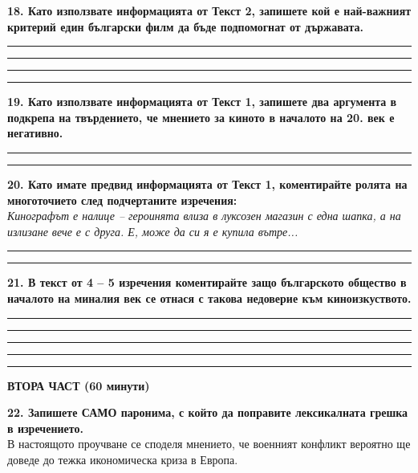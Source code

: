 \documentclass[12pt,a4paper]{article}
\begin{document}
\vspace{0.6cm}

\noindent
\textbf{18. Като използвате информацията от Текст 2, запишете кой е най-важният критерий един български филм да бъде подпомогнат от държавата.}

\vspace{0.2cm}
\noindent\rule{\linewidth}{0.4pt}
\noindent\rule{\linewidth}{0.4pt}
\noindent\rule{\linewidth}{0.4pt}
\noindent\rule{\linewidth}{0.4pt}

\vspace{0.6cm}

\noindent
\textbf{19. Като използвате информацията от Текст 1, запишете два аргумента в подкрепа на твърдението, че мнението за киното в началото на 20. век е негативно.}

\vspace{0.2cm}
\noindent\rule{\linewidth}{0.4pt}
\noindent\rule{\linewidth}{0.4pt}

\vspace{0.4cm}

\noindent
\textbf{20. Като имате предвид информацията от Текст 1, коментирайте ролята на многоточието след подчертаните изречения:} \\
\textit{Кинографът е налице – героинята влиза в луксозен магазин с една шапка, а на излизане вече е с друга. Е, може да си я е купила вътре...}

\vspace{0.2cm}
\noindent\rule{\linewidth}{0.4pt}
\noindent\rule{\linewidth}{0.4pt}

\vspace{0.4cm}

\noindent
\textbf{21. В текст от 4 – 5 изречения коментирайте защо българското общество в началото на миналия век се отнася с такова недоверие към киноизкуството.}

\vspace{0.2cm}
\noindent\rule{\linewidth}{0.4pt}
\noindent\rule{\linewidth}{0.4pt}
\noindent\rule{\linewidth}{0.4pt}
\noindent\rule{\linewidth}{0.4pt}
\noindent\rule{\linewidth}{0.4pt}

\newpage

\vspace{0.2cm}
\noindent
\textbf{ВТОРА ЧАСТ (60 минути)}

\vspace{0.4cm}

\noindent
\textbf{22. Запишете САМО паронима, с който да поправите лексикалната грешка в изречението.}\\
В настоящото проучване се споделя мнението, че военният конфликт вероятно ще доведе до тежка икономическа криза в Европа.
\end{document}
